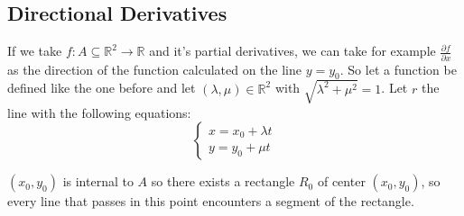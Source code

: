 \documentclass{article}
\begin{document}
    \subsection*{Directional Derivatives}
    If we take $f : A \subseteq \mathbb{R}^2 \rightarrow \mathbb{R}$ and it's partial derivatives, we can take for example $\frac{\partial f}{\partial x}$ as the direction of the function calculated on the line $y = y_0$.
    So let a function be defined like the one before and let $(\lambda, \mu) \in \mathbb{R}^2$ with $\sqrt{\lambda^2 + \mu^2} = 1$.
    Let $r$ the line with the following equations:
    \begin{equation*}
        \begin{cases}
            x = x_0 + \lambda t \\
            y = y_0 + \mu t
        \end{cases}
    \end{equation*}
    
    $(x_0, y_0)$ is internal to $A$ so there exists a rectangle $R_0$ of center $(x_0, y_0)$, so every line that passes in this point encounters a segment of the rectangle.
\end{document}
